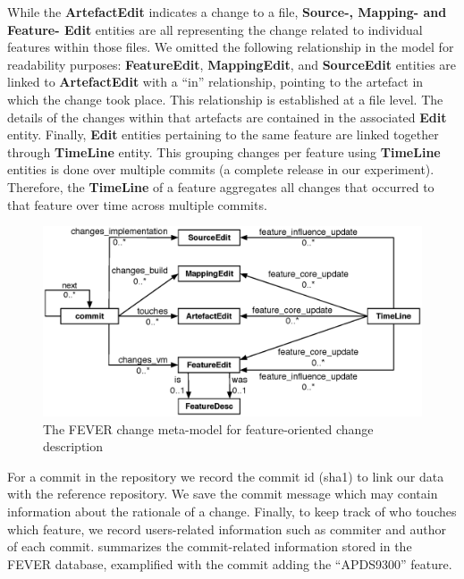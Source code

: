 While the \textbf{ArtefactEdit} indicates a change to a file, \textbf{Source-, Mapping- and Feature- Edit} entities
are all representing the change related to individual features within those files.
We omitted the following relationship in the model for readability purposes:
\textbf{FeatureEdit}, \textbf{MappingEdit}, and \textbf{SourceEdit} entities are linked
to \textbf{ArtefactEdit} with a ``in'' relationship, pointing to the artefact in which the change took place.
This relationship is established at a file level. The details of the changes within that artefacts are contained 
in the associated \textbf{Edit} entity.
Finally, \textbf{Edit} entities pertaining to the same feature are linked together through \textbf{TimeLine} entity.
This grouping changes per feature using \textbf{TimeLine} entities is done over multiple commits (a complete release in our experiment).
Therefore, the \textbf{TimeLine} of a feature aggregates all changes that occurred to that feature over time \ie across multiple commits.

\begin{figure}[ht]
	\centering
	\includegraphics[scale=0.5]{change_model_new.eps}
	\caption{The FEVER change meta-model for feature-oriented change description}
	\label{fig:patch_change_model}
\end{figure}

For a commit in the repository we record the commit id (sha1) to link our data with the reference repository. 
We save the commit message which may contain information about the rationale of a change.
Finally, to keep track of who touches which feature, we record users-related information such as commiter and author of each commit.
 summarizes the commit-related information stored in the FEVER database, examplified with the commit adding the 
``APDS9300'' feature.


